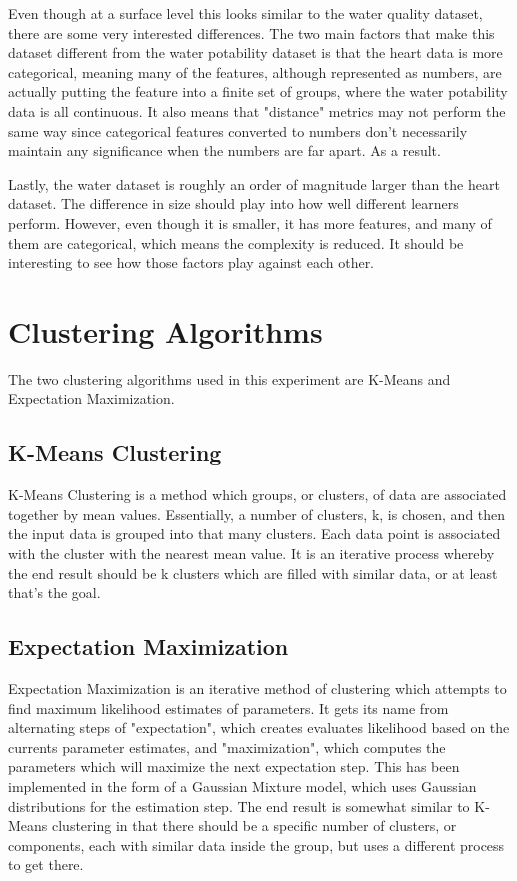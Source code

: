 \documentclass[
	letterpaper, %
]{mlreport}
\begin{document}
Even though at a surface level this looks similar to the water quality dataset, there are some very interested differences. The two main factors that make this dataset different from the water potability dataset is that the heart data is more categorical, meaning many of the features, although represented as numbers, are actually putting the feature into a finite set of groups, where the water potability data is all continuous. It also means that "distance" metrics may not perform the same way since categorical features converted to numbers don't necessarily maintain any significance when the numbers are far apart. As a result.

Lastly, the water dataset is roughly an order of magnitude larger than the heart dataset. The difference in size should play into how well different learners perform. However, even though it is smaller, it has more features, and many of them are categorical, which means the complexity is reduced. It should be interesting to see how those factors play against each other.

\section{Clustering Algorithms}
The two clustering algorithms used in this experiment are K-Means and Expectation Maximization.
\subsection{K-Means Clustering}
K-Means Clustering is a method which groups, or clusters, of data are associated together by mean values. Essentially, a number of clusters, k, is chosen, and then the input data is grouped into that many clusters. Each data point is associated with the cluster with the nearest mean value. It is an iterative process whereby the end result should be k clusters which are filled with similar data, or at least that's the goal.
\subsection{Expectation Maximization}
Expectation Maximization is an iterative method of clustering which attempts to find maximum likelihood estimates of parameters. It gets its name from alternating steps of "expectation", which creates evaluates likelihood based on the currents parameter estimates, and "maximization", which computes the parameters which will maximize the next expectation step. This has been implemented in the form of a Gaussian Mixture model, which uses Gaussian distributions for the estimation step. The end result is somewhat similar to K-Means clustering in that there should be a specific number of clusters, or components, each with similar data inside the group, but uses a different process to get there.
\end{document}
